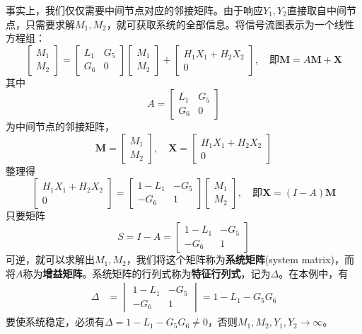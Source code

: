 \begin{example}
    事实上，我们仅仅需要中间节点对应的邻接矩阵。由于响应$Y_1,Y_2$直接取自中间节点，只需要求解$M_1,M_2$，就可获取系统的全部信息。将信号流图表示为一个线性方程组：
    \[\begin{bmatrix}
        M_1 \\
        M_2
    \end{bmatrix}=
    \begin{bmatrix}
        L_1 & G_5\\
        G_6 & 0
    \end{bmatrix}
    \begin{bmatrix}
        M_1 \\
        M_2
    \end{bmatrix}+\begin{bmatrix}
        H_1 X_1 + H_2 X_2 \\
        0
    \end{bmatrix},\quad\text{即}\mathbf{M}=A\mathbf{M}+\mathbf{X}\]
    其中$$A=\begin{bmatrix}
        L_1 & G_5\\
        G_6 & 0
    \end{bmatrix}$$
    为中间节点的邻接矩阵，
    $$\mathbf{M}=\begin{bmatrix}
        M_1 \\
        M_2
    \end{bmatrix},\quad\mathbf{X}=\begin{bmatrix}
        H_1 X_1 + H_2 X_2 \\
        0
    \end{bmatrix}$$
    整理得\[\begin{bmatrix}
        H_1 X_1 + H_2 X_2 \\
        0
    \end{bmatrix}=\begin{bmatrix}
        1 -L_1 & -G_5\\
        -G_6 & 1
    \end{bmatrix}\begin{bmatrix}
        M_1 \\
        M_2
    \end{bmatrix},\quad \text{即}\mathbf{X}=(I-A)\mathbf{M}\]
    只要矩阵\[S=I-A=\begin{bmatrix}
        1 -L_1 & -G_5\\
        -G_6 & 1
    \end{bmatrix}\]
    可逆，就可以求解出$M_1,M_2$，我们将这个矩阵称为\textbf{系统矩阵}(system matrix)，而将$A$称为\textbf{增益矩阵}。系统矩阵的行列式称为\textbf{特征行列式}，记为$\Delta$。在本例中，有\begin{align*}
        \Delta&=\begin{vmatrix}
        1 -L_1 & -G_5 \\
        -G_6 & 1
    \end{vmatrix}=1-L_1-G_5 G_6
    \end{align*}
    要使系统稳定，必须有$\Delta=1-L_1-G_5 G_6\neq 0$，否则$M_1,M_2,Y_1,Y_2\to\infty$。
\end{example}

